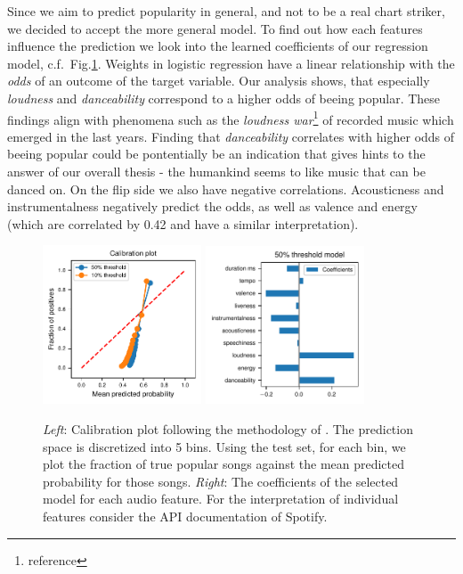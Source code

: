 \documentclass{article}
\begin{document}
Since we aim to predict popularity in general, and not to be a real chart striker, we decided to accept the more general model.
To find out how each features influence the prediction we look into the learned coefficients of our regression model, c.f.~Fig.\ref{fig:logis_eval}.
Weights in logistic regression have a linear relationship with the \textit{odds} of an outcome of the target variable.
Our analysis shows, that especially \textit{loudness} and \textit{danceability} correspond to a higher odds of beeing popular.
These findings align with phenomena such as the \textit{loudness war}\footnote{reference} of recorded music which emerged in the last years.
Finding that \textit{danceability} correlates with higher odds of beeing popular could be pontentially be an indication that gives hints to the answer of our overall thesis - the humankind seems to like music that can be danced on.
On the flip side we also have negative correlations. 
Acousticness and instrumentalness negatively predict the odds, as well as valence and energy (which are correlated by 0.42 and have a similar interpretation).


\begin{figure}
  \includegraphics[width=0.42\textwidth]{../figures/calibration_combined.pdf}
  \qquad
  \includegraphics[width=0.42\textwidth]{../figures/logistic_coefs_50_threshold_model.pdf}
  \caption{\textit{Left}: Calibration plot following the methodology of \cite{niculescu-mizilPredictingGoodProbabilities2005}. The prediction space is discretized into 5 bins. Using the test set, for each bin, we plot the fraction of true popular songs against the mean predicted probability for those songs. \textit{Right}: The coefficients of the selected model for each audio feature. For the interpretation of individual features consider the API documentation of Spotify.}
  \label{fig:logis_eval}
\end{figure}
\end{document}
